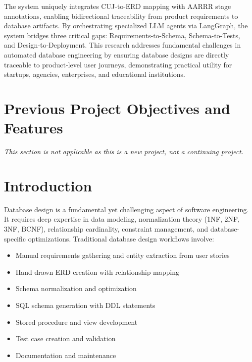 \documentclass[12pt,a4paper]{article}
\begin{document}
The system uniquely integrates CUJ-to-ERD mapping with AARRR stage annotations, enabling bidirectional traceability from product requirements to database artifacts. By orchestrating specialized LLM agents via LangGraph, the system bridges three critical gaps: Requirements-to-Schema, Schema-to-Tests, and Design-to-Deployment. This research addresses fundamental challenges in automated database engineering by ensuring database designs are directly traceable to product-level user journeys, demonstrating practical utility for startups, agencies, enterprises, and educational institutions.

\vspace{1cm}

\section*{Previous Project Objectives and Features}

\textit{This section is not applicable as this is a new project, not a continuing project.}

\vspace{1cm}

\section{Introduction}

Database design is a fundamental yet challenging aspect of software engineering. It requires deep expertise in data modeling, normalization theory (1NF, 2NF, 3NF, BCNF), relationship cardinality, constraint management, and database-specific optimizations. Traditional database design workflows involve:

\begin{itemize}
\item Manual requirements gathering and entity extraction from user stories
\item Hand-drawn ERD creation with relationship mapping
\item Schema normalization and optimization
\item SQL schema generation with DDL statements
\item Stored procedure and view development
\item Test case creation and validation
\item Documentation and maintenance
\end{itemize}
\end{document}
